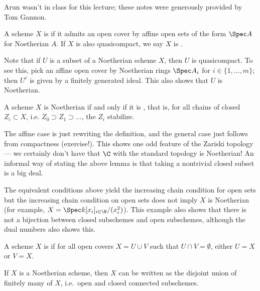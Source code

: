\label{finiteness}
Arun wasn't in class for this lecture; these notes were generously provided by Tom Gannon.
\begin{defn}
A scheme $X$ is  if it admits an open cover by affine open sets of the form $\Spec A$ for Noetherian $A$. If $X$ is also quasicompact, we say $X$ is .
\end{defn}

\begin{rem}
Note that if $U$ is a subset of a Noetherian scheme $X$, then $U$ is quasicompact. To see this, pick an affine open
cover by Noetherian rings $\Spec A_i$ for $i \in \{1, \dotsc, m\}$; then $U^c$ is given by a finitely generated ideal. This also shows that $U$ is Noetherian. 
\end{rem}

\begin{lem}
A scheme $X$ is Noetherian if and only if it is , that is, for all chains of closed
$Z_i \subset X$, i.e. $Z_0 \supset Z_1 \supset\dots$, the $Z_i$ stabilize. 
\end{lem}

The affine case is just rewriting the definition, and the general case just follows from compactness (exercise!).
This shows one odd feature of the Zariski topology --- we certainly don't have that $\C$ with the standard topology is Noetherian! An informal way of stating the above lemma is that taking a nontrivial closed subset is a big deal. 

\begin{rem}
The equivalent conditions above yield the increasing chain condition for open sets but the increasing chain condition on open sets does not imply $X$ is Noetherian (for example, $X = \Spec k[x_i]_{i \in \N} / (x_i^2)$). This example also shows that there is not a bijection between closed subschemes and open subschemes, although the dual numbers also shows this.
\end{rem}

\begin{defn}
A scheme $X$ is  if for all open covers $X = U \cup V$ such that $U \cap V = \emptyset$, either $U = X$ or $V = X$. 
\end{defn}

\begin{lem}
If $X$ is a Noetherian scheme, then $X$ can be written as the disjoint union of finitely many  of $X$, i.e.\ open and closed connected subschemes.
\end{lem}

